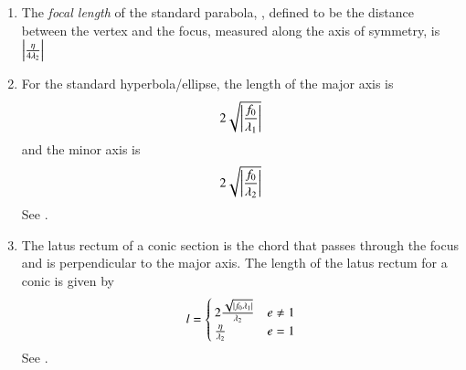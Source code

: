 \begin{enumerate}[label=\thesubsection.\arabic*.,ref=\thesubsection.\theenumi]
	\begin{proof}
					\eqref{eq:axis-std-parab} can be expressed as 
    \begin{align}
			\vec{y}= \alpha \vec{e}_1. 
					\label{eq:axis-std-parab-dir} 
    \end{align}
					Substituting \eqref{eq:axis-std-parab-dir} in 
    \eqref{eq:conic_simp_temp_parab}, 
    \begin{align}
	     \alpha^2 \vec{e}_1^{\top}\vec{D} \vec{e}_1 &=  -\eta\alpha \vec{e}_1^{\top} \vec{e}_1   
	     \\
	     \implies \alpha &=0, \text{ or, } \vec{y} = \vec{0}.
    \end{align}
	\end{proof}
	\item
			\label{corr:foclen}
	 The {\em focal length} of the standard parabola, , defined to be the distance between the vertex and the focus, measured along the axis of symmetry, is $\left\vert\frac{\eta}{4 \lambda_2}\right\vert$
    \item For the standard hyperbola/ellipse, the length of the major axis is 
  \begin{align}
\label{eq:chord-len-major}
 2\sqrt{\left\vert\frac{
f_0}
{\lambda_1}
	  \right\vert}
  \end{align}
  and the minor axis is 
  \begin{align}
\label{eq:chord-len-minor}
 2\sqrt{\left\vert\frac{
f_0}
{\lambda_2}
	  \right\vert}
  \end{align}
  \solution 
		See .
\item
    The latus rectum of a conic section is the chord that passes through the focus and is perpendicular to the major axis.
	The length of the latus rectum for a conic is given by
		\begin{align}
			l =
			\begin{cases}
				2\frac{\sqrt{\left\vert f_0\lambda_1\right\vert}}{\lambda_2} & e \ne 1
			\\
			\frac{\eta}{\lambda_2} & e = 1
			\end{cases}
			\label{eq:latus-ellipse}
		\end{align}
		\solution 
		See .

\end{enumerate}
